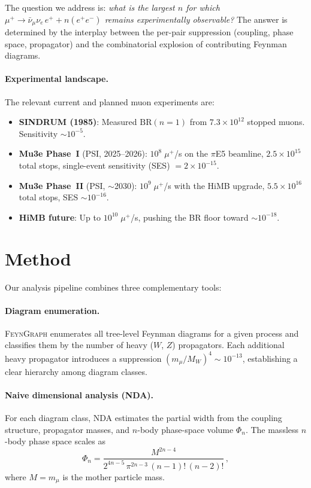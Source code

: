 \documentclass[11pt,a4paper]{article}
\begin{document}
The question we address is: \emph{what is the largest $n$ for which
$\mu^+ \to \bar\nu_\mu \nu_e \, e^+ + n(e^+e^-)$ remains
experimentally observable?}
The answer is determined by the interplay between the per-pair
suppression (coupling, phase space, propagator) and the combinatorial
explosion of contributing Feynman diagrams.

\paragraph{Experimental landscape.}
The relevant current and planned muon experiments are:
\begin{itemize}
\item \textbf{SINDRUM (1985)}: Measured $\text{BR}(n\!=\!1)$ from
  $7.3\times10^{12}$ stopped muons. Sensitivity $\sim\!10^{-5}$.
\item \textbf{Mu3e Phase~I} (PSI, 2025--2026):
  $10^8\;\mu^+$/s on the $\pi$E5 beamline,
  $2.5\times10^{15}$ total stops,
  single-event sensitivity (SES) $= 2\times10^{-15}$.
\item \textbf{Mu3e Phase~II} (PSI, $\sim$2030):
  $10^9\;\mu^+$/s with the HiMB upgrade,
  $5.5\times10^{16}$ total stops, SES $\sim 10^{-16}$.
\item \textbf{HiMB future}: Up to $10^{10}\;\mu^+$/s,
  pushing the BR floor toward $\sim\!10^{-18}$.
\end{itemize}

\section{Method}
\label{sec:method}

Our analysis pipeline combines three complementary tools:

\paragraph{Diagram enumeration.}
\textsc{FeynGraph} enumerates all tree-level Feynman diagrams for a
given process and classifies them by the number of heavy
($W$, $Z$) propagators.
Each additional heavy propagator introduces a suppression
$(m_\mu/M_W)^4 \sim 10^{-13}$, establishing a clear hierarchy
among diagram classes.

\paragraph{Naive dimensional analysis (NDA).}
For each diagram class, NDA estimates the partial width from the
coupling structure, propagator masses, and $n$-body phase-space volume
$\Phi_n$.
The massless $n$-body phase space scales as
\begin{equation}
\Phi_n = \frac{M^{2n-4}}{2^{4n-5}\,\pi^{2n-3}\,(n-1)!\,(n-2)!}\,,
\label{eq:phasespace}
\end{equation}
where $M = m_\mu$ is the mother particle mass.
\end{document}
